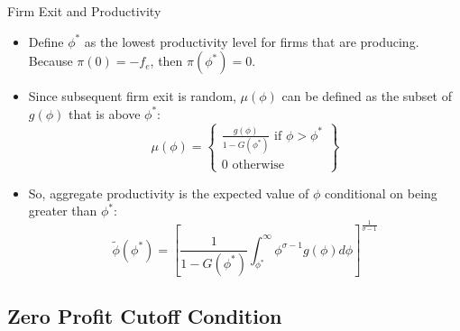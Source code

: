 \documentclass[aspectratio=169]{beamer}
\begin{document}
\begin{frame}{Firm Exit and Productivity}

\begin{itemize}
    \item<1-> Define $ \phi^{*} $ as the lowest productivity level for firms that are producing.  Because $ \pi\left( 0 \right) = - f_{e} $, then $ \pi\left( \phi^{*} \right) = 0 $.
    \item<2-> Since subsequent firm exit is random, $ \mu\left( \phi \right) $ can be defined as the subset of $ g\left( \phi \right) $ that is above $ \phi^{*} $:
    \begin{equation*}
        \mu\left( \phi \right) = \left\{ \begin{matrix}
           \frac{g\left( \phi \right)}{1 - G\left( \phi^{*} \right)} \text{ if } \phi > \phi^{*} \\
           0 \text{ otherwise}
        \end{matrix} \right\}
    \end{equation*}
    \item<3-> So, aggregate productivity is the expected value of $ \phi $ conditional on being greater than $ \phi^{*} $:
    \begin{equation*}
        \tilde{\phi}\left( \phi^{*} \right) = \left[ \frac{1}{1 - G\left( \phi^{*} \right)} \int_{\phi^{*}}^{\infty } \phi^{\sigma - 1} g\left( \phi \right) d\phi \right]^{\frac{1}{\sigma - 1}}
    \end{equation*}
\end{itemize}
    
\end{frame}


\subsection{Zero Profit Cutoff Condition}

\end{document}
